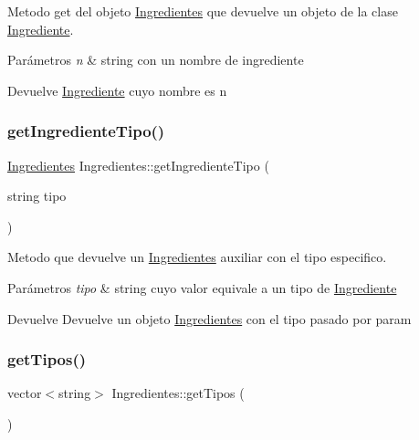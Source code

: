 Metodo get del objeto \hyperlink{classIngredientes}{Ingredientes} que devuelve un objeto de la clase \hyperlink{classIngrediente}{Ingrediente}. 


\begin{DoxyParams}{Parámetros}
{\em n} & string con un nombre de ingrediente \\
\hline
\end{DoxyParams}
\begin{DoxyReturn}{Devuelve}
\hyperlink{classIngrediente}{Ingrediente} cuyo nombre es n 
\end{DoxyReturn}
\mbox{\label{classIngredientes_a513a2a7af0995e893b288ca4cb4c49ef}} 
\subsubsection{\texorpdfstring{get\+Ingrediente\+Tipo()}{getIngredienteTipo()}}
{\footnotesize\ttfamily \hyperlink{classIngredientes}{Ingredientes} Ingredientes\+::get\+Ingrediente\+Tipo (\begin{DoxyParamCaption}\item[{string}]{tipo }\end{DoxyParamCaption})}



Metodo que devuelve un \hyperlink{classIngredientes}{Ingredientes} auxiliar con el tipo especifico. 


\begin{DoxyParams}{Parámetros}
{\em tipo} & string cuyo valor equivale a un tipo de \hyperlink{classIngrediente}{Ingrediente} \\
\hline
\end{DoxyParams}
\begin{DoxyReturn}{Devuelve}
Devuelve un objeto \hyperlink{classIngredientes}{Ingredientes} con el tipo pasado por param 
\end{DoxyReturn}
\mbox{\label{classIngredientes_a9869f4642af46cd91d426c9a4e22019a}} 
\subsubsection{\texorpdfstring{get\+Tipos()}{getTipos()}}
{\footnotesize\ttfamily vector$<$string$>$ Ingredientes\+::get\+Tipos (\begin{DoxyParamCaption}{ }\end{DoxyParamCaption})}



